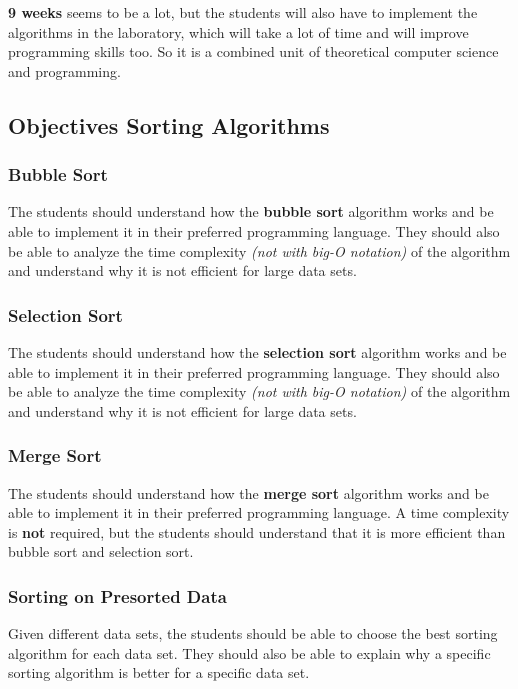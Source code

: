 \documentclass[10pt, oneside]{article}
\theoremstyle{remark}
\begin{document}
\textbf{9 weeks} seems to be a lot, but the students will also have to implement the algorithms in the laboratory, which will take a lot of time and will improve programming skills too. So it is a combined unit of theoretical computer science and programming.

\subsection{Objectives Sorting Algorithms}

\subsubsection{Bubble Sort}
The students should understand how the \textbf{bubble sort} algorithm works and be able to implement it in their preferred programming language. They should also be able to analyze the time complexity \textit{(not with big-O notation)} of the algorithm and understand why it is not efficient for large data sets.

\subsubsection{Selection Sort}
The students should understand how the \textbf{selection sort} algorithm works and be able to implement it in their preferred programming language. They should also be able to analyze the time complexity \textit{(not with big-O notation)} of the algorithm and understand why it is not efficient for large data sets.

\subsubsection{Merge Sort}
The students should understand how the \textbf{merge sort} algorithm works and be able to implement it in their preferred programming language. A time complexity is \textbf{not} required, but the students should understand that it is more efficient than bubble sort and selection sort.

\subsubsection{Sorting on Presorted Data}
Given different data sets, the students should be able to choose the best sorting algorithm for each data set. They should also be able to explain why a specific sorting algorithm is better for a specific data set.
\end{document}
